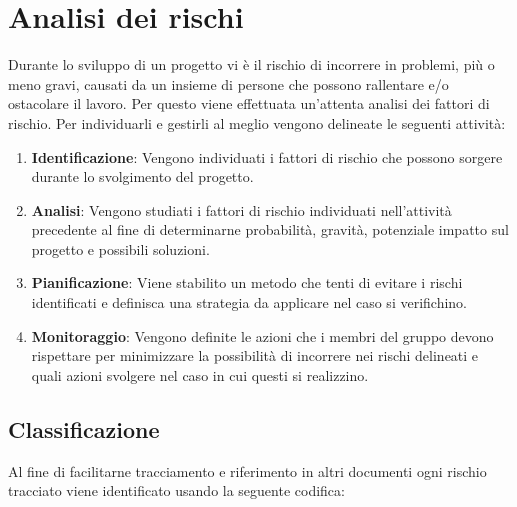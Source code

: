 \section{Analisi dei rischi}\label{section:analisi_rischi}

Durante lo sviluppo di un progetto vi è il rischio di incorrere in problemi, più o meno gravi, causati da un insieme di persone che possono rallentare e/o ostacolare il lavoro.
Per questo viene effettuata un’attenta analisi dei fattori di rischio. Per individuarli e gestirli al meglio vengono delineate le seguenti attività:

\begin{enumerate}
    \item \textbf{Identificazione}:  Vengono individuati i fattori di rischio che possono sorgere durante lo svolgimento del progetto.
    \item  \textbf{Analisi}: Vengono studiati i fattori di rischio individuati nell'attività precedente al fine di determinarne probabilità, gravità, potenziale impatto sul progetto e possibili soluzioni.
    \item \textbf{Pianificazione}: Viene stabilito un metodo che tenti di evitare i rischi identificati e definisca una strategia da applicare nel caso si verifichino.
    \item \textbf{Monitoraggio}: Vengono definite le azioni che i membri del gruppo devono rispettare per minimizzare la possibilità di incorrere nei rischi delineati e quali azioni svolgere nel caso in cui questi si realizzino.
\end{enumerate}

\subsection{Classificazione}\label{subsection:classificazione_rischi}

Al fine di facilitarne tracciamento e riferimento in altri documenti ogni rischio tracciato viene identificato
usando la seguente codifica:

